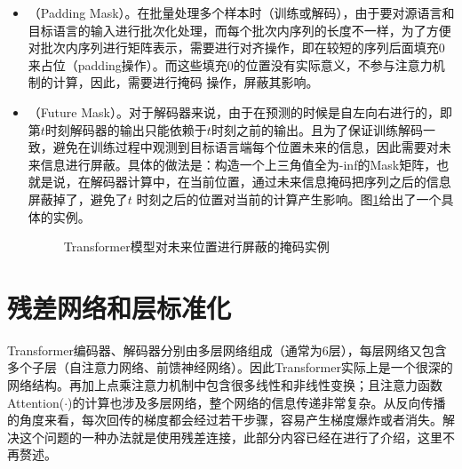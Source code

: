 \begin{itemize}
\vspace{0.5em}
\item {\small{}}（Padding Mask）。在批量处理多个样本时（训练或解码），由于要对源语言和目标语言的输入进行批次化处理，而每个批次内序列的长度不一样，为了方便对批次内序列进行矩阵表示，需要进行对齐操作，即在较短的序列后面填充0来占位（padding操作）。而这些填充0的位置没有实际意义，不参与注意力机制的计算，因此，需要进行掩码 操作，屏蔽其影响。
\vspace{0.5em}
\item {\small{}}（Future Mask）。对于解码器来说，由于在预测的时候是自左向右进行的，即第$t$时刻解码器的输出只能依赖于$t$时刻之前的输出。且为了保证训练解码一致，避免在训练过程中观测到目标语言端每个位置未来的信息，因此需要对未来信息进行屏蔽。具体的做法是：构造一个上三角值全为-inf的Mask矩阵，也就是说，在解码器计算中，在当前位置，通过未来信息掩码把序列之后的信息屏蔽掉了，避免了$t$ 时刻之后的位置对当前的计算产生影响。图\ref{fig:12-13}给出了一个具体的实例。

\begin{figure}[htp]
\centering

\caption{Transformer模型对未来位置进行屏蔽的掩码实例}
\label{fig:12-13}
\end{figure}

\vspace{0.5em}
\end{itemize}

\sectionnewpage
\section{残差网络和层标准化}

\parinterval Transformer编码器、解码器分别由多层网络组成（通常为6层），每层网络又包含多个子层（自注意力网络、前馈神经网络）。因此Transformer实际上是一个很深的网络结构。再加上点乘注意力机制中包含很多线性和非线性变换；且注意力函数Attention($\cdot$)的计算也涉及多层网络，整个网络的信息传递非常复杂。从反向传播的角度来看，每次回传的梯度都会经过若干步骤，容易产生梯度爆炸或者消失。解决这个问题的一种办法就是使用残差连接，此部分内容已经在{\chapternine}进行了介绍，这里不再赘述。

